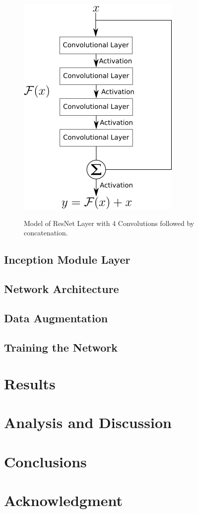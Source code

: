 \documentclass[conference]{IEEEtran}
\begin{document}
\begin{figure}
\centering
\includegraphics[scale=0.65]{figures/ResNet_Model.png}
\label{ResNet Layer Model}
\caption{Model of ResNet Layer with 4 Convolutions followed by concatenation.}
\end{figure}

\subsection{Inception Module Layer}
\subsection{Network Architecture}
\subsection{Data Augmentation}
\subsection{Training the Network}

\section{Results}

\section{Analysis and Discussion}

\section{Conclusions}

\section*{Acknowledgment}


\end{document}
